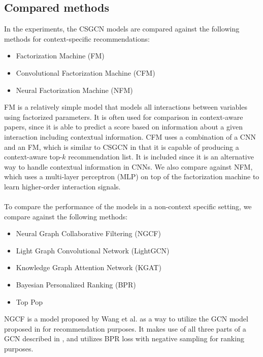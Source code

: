 \subsection{Compared methods}
In the experiments, the CSGCN models are compared against the following methods for context-specific recommendations:
\begin{itemize}
    \item Factorization Machine (FM) \cite{fmrendle}
    \item Convolutional Factorization Machine (CFM) \cite{CFM}
    \item Neural Factorization Machine (NFM) \cite{NeuralFM}
\end{itemize}
FM is a relatively simple model that models all interactions between variables using factorized parameters.
It is often used for comparison in context-aware papers, since it is able to predict a score based on information about a given interaction including contextual information.
CFM uses a combination of a CNN and an FM, which is similar to CSGCN in that it is capable of producing a context-aware top-$k$ recommendation list.
It is included since it is an alternative way to handle contextual information in CNNs.
We also compare against NFM, which uses a multi-layer perceptron (MLP) on top of the factorization machine to learn higher-order interaction signals.
\\\\
To compare the performance of the models in a non-context specific setting, we compare against the following methods:
\begin{itemize}
    \item Neural Graph Collaborative Filtering (NGCF) \cite{NGCF}
    \item Light Graph Convolutional Network (LightGCN) \cite{LightGCN}
    \item Knowledge Graph Attention Network (KGAT) \cite{KGAT}
    \item Bayesian Personalized Ranking (BPR) \cite{BPR}
    \item Top Pop
\end{itemize}
NGCF is a model proposed by Wang et al. as a way to utilize the GCN model proposed in \cite{KOrderConnectivity} for recommendation purposes.
It makes use of all three parts of a GCN described in , and utilizes BPR loss with negative sampling for ranking purposes.
